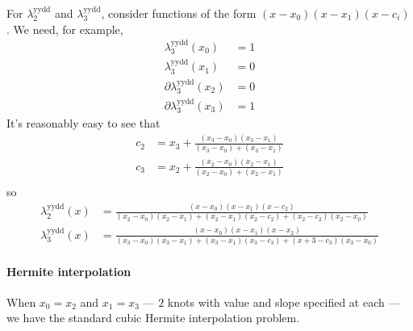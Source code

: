 For $\lambda^{\text{yydd}}_2$ and $\lambda^{\text{yydd}}_3$, 
consider functions of the form $(x-x_0)(x-x_1)(x-c_i)$.
We need, for example, 
\begin{align}
\lambda^{\text{yydd}}_3(x_0) & = 1 \\ 
\lambda^{\text{yydd}}_3(x_1) & = 0 \nonumber \\
\partial\lambda^{\text{yydd}}_3(x_2) & = 0 \nonumber \\
\partial\lambda^{\text{yydd}}_3(x_3) & = 1 \nonumber 
\end{align}
It's reasonably easy to see that 
\begin{align}
c_2 & = x_3 + 
\frac{(x_3 - x_0)(x_3 - x_1)}{(x_3 - x_0) + (x_3 - x_1)} \\
c_3 & = x_2 + 
\frac{(x_2 - x_0)(x_2 - x_1)}{(x_2 - x_0) + (x_2 - x_1)} \\
\end{align}
so
\begin{align}
\lambda^{\text{yydd}}_2(x) & =
\frac{(x-x_0)(x-x_1)(x-c_2)}
{
(x_2-x_0)(x_2-x_1) +
(x_2-x_1)(x_2-c_2) +
(x_2-c_2)(x_2-x_0)}
\\
\lambda^{\text{yydd}}_3(x) & =
\frac{(x-x_0)(x-x_1)(x-x_2)}
{
(x_3-x_0)(x_3-x_1) +
(x_3-x_1)(x_3-c_3) +
(x+3-c_3)(x_3-x_0)}
\nonumber
\end{align}

\paragraph{Hermite interpolation}\label{sec:Hermite-yydd}

When $x_0 = x_2$ and $x_1 = x_3$ --- $2$ knots with value and 
slope specified at each --- 
we have the standard cubic Hermite interpolation
problem\cite{wiki:cubic-hermite-spline}.

